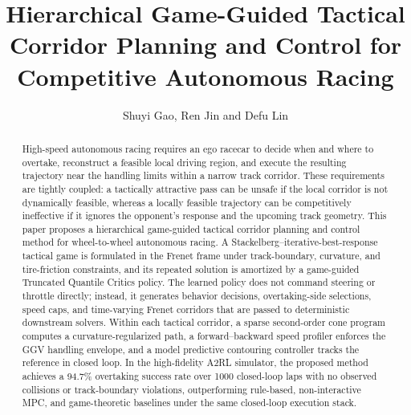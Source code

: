 \documentclass{iopjournal}
\begin{document}

\title{Hierarchical Game-Guided Tactical Corridor Planning and Control for Competitive Autonomous Racing}

\author{Shuyi Gao, Ren Jin and Defu Lin}



\begin{abstract}

High-speed autonomous racing requires an ego racecar to decide when and where
to overtake, reconstruct a feasible local driving region, and execute the
resulting trajectory near the handling limits within a narrow track corridor.
These requirements are tightly coupled: a tactically attractive pass can be
unsafe if the local corridor is not dynamically feasible, whereas a locally
feasible trajectory can be competitively ineffective if it ignores the
opponent's response and the upcoming track geometry.  This paper proposes a
hierarchical game-guided tactical corridor planning and control method for
wheel-to-wheel autonomous racing.  A Stackelberg--iterative-best-response
tactical game is formulated in the Frenet frame under track-boundary,
curvature, and tire-friction constraints, and its repeated solution is
amortized by a game-guided Truncated Quantile Critics policy.  The learned
policy does not command steering or throttle directly; instead, it generates
behavior decisions, overtaking-side selections, speed caps, and time-varying
Frenet corridors that are passed to deterministic downstream solvers.  Within
each tactical corridor, a sparse second-order cone program computes a
curvature-regularized path, a forward--backward speed profiler enforces the
GGV handling envelope, and a model predictive contouring controller tracks the
reference in closed loop.  In the high-fidelity A2RL simulator, the proposed
method achieves a 94.7\% overtaking success rate over 1000 closed-loop laps
with no observed collisions or track-boundary violations, outperforming
rule-based, non-interactive MPC, and game-theoretic baselines under the same
closed-loop execution stack.




\end{abstract}

\end{document}
